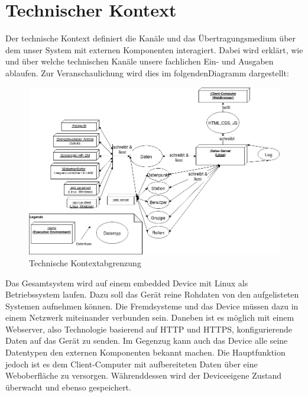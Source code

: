 \section{Technischer Kontext}
Der technische Kontext definiert die Kanäle und das Übertragungsmedium über dem unser System mit externen Komponenten interagiert. Dabei wird erklärt, wie und über welche technischen Kanäle unsere fachlichen Ein- und Ausgaben ablaufen. Zur Veranschaulichung wird dies im folgendenDiagramm dargestellt:

\begin{figure}[h]
	\centering
	\includegraphics[width=1\textwidth]{Graphics/technische_kontextabgrenzung.png}
	\caption{Technische Kontextabgrenzung}
	\label{fig:technische_kontextabgrenzung}
\end{figure}
Das Gesamtsystem wird auf einem embedded Device mit Linux als Betriebssystem laufen. Dazu soll das Gerät reine Rohdaten von den aufgelisteten Systemen aufnehmen können. Die Fremdsysteme und das Device müssen dazu in einem Netzwerk miteinander verbunden sein. Daneben ist es möglich mit einem Webserver, also Technologie basierend auf HTTP und HTTPS, konfigurierende Daten auf das Gerät zu senden. Im Gegenzug kann auch das Device alle seine Datentypen den externen Komponenten bekannt machen. Die Hauptfunktion jedoch ist es dem Client-Computer mit aufbereiteten Daten über eine Weboberfläche zu versorgen. Währenddessen wird der Deviceeigene Zustand überwacht und ebenso gespeichert.

